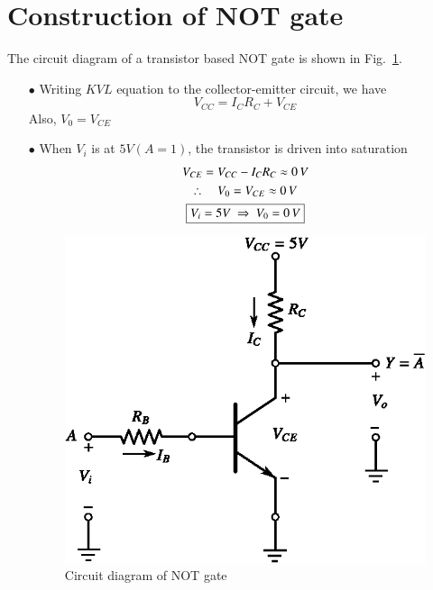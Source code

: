 \section{Construction of NOT gate}\label{sec6.20}

The circuit diagram of a transistor based NOT gate is shown in Fig.~\ref{fig6.13}.
\begin{itemize}
\item[$\bullet$] Writing $KVL$ equation to the collector-emitter circuit, we have
$$
V_{CC}=I_{C}R_{C}+V_{CE}
$$
Also, $V_{0}=V_{CE}$

\item[$\bullet$] When $V_{i}$ is at $5V(A=1)$, the transistor is driven into saturation
\begin{gather*}
V_{CE}=V_{CC}-I_{C}R_{C}\approx 0\,V\\
\therefore\quad V_{0}=V_{CE}\approx 0\,V\\
\text{\fbox{$V_{i}=5V\ \Rightarrow \ V_{0}=0\,V$}}
\end{gather*}
\begin{figure}[H]
\centering
\includegraphics{chap6/fig87_6.13.eps}
\caption{Circuit diagram of NOT gate}\label{fig6.13}
\end{figure}



\end{itemize}
